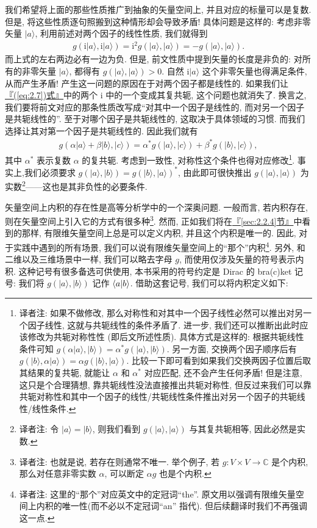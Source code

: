 \documentclass[lang=cn,zihao=-4,twoside,fontset=none]{textbook}
\newcommand{\gt}{>}
\def\EQ#1{\begin{equation}\begin{aligned}{}#1\end{aligned}\end{equation}}
\def\eq#1{\[\begin{aligned}{}#1\end{aligned}\]}
\renewcommand{\eqref}[1]{\hyperref[#1]{『\textnormal{(\ref*{#1})}式』}}
\newcommand{\secref}[1]{\hyperref[#1]{『\textnormal{\ref*{#1}}节』}}
\newcommand{\ii}{{\mathrm{i}}}
\renewcommand{\ket}[1]{| #1 \rangle}
\begin{document}
我们希望将上面的那些性质推广到抽象的矢量空间上, 并且对应的标量可以是复数. 但是, 将这些性质逐句照搬到这种情形却会导致矛盾! 具体问题是这样的: 考虑非零矢量 $\ket{a}$, 利用前述对两个因子的线性性质, 我们就得到 
\EQ{
    g(\ii\ket{a},\ii\ket{a})=\ii^2 g(\ket{a},\ket{a})=-g(\ket{a},\ket{a}). \label{eq:2.7}
}
而上式的左右两边必有一边为负. 但是, 前文性质中提到矢量的长度是非负的: 对所有的非零矢量 $\ket{a}$, 都得有 $g(\ket{a},\ket{a})\gt 0$. 自然 $\ii\ket{a}$ 这个非零矢量也得满足条件, 从而产生矛盾! 产生这一问题的原因在于对两个因子都是线性的. 如果我们让\eqref{eq:2.7}中的两个 $\ii$ 中的一个变成其复共轭, 这个问题也就消失了. 换言之, 我们要将前文对应的那条性质改写成``对其中一个因子是线性的, 而对另一个因子是共轭线性的''. 至于对哪个因子是共轭线性的, 这取决于具体领域的习惯. 而我们选择让其对第一个因子是共轭线性的. 因此我们就有 
\eq{
    g(\alpha\ket{a}+\beta\ket{b},\ket{c})=\alpha^* g(\ket{a},\ket{c}) + \beta^* g(\ket{b},\ket{c}),
}
其中 $\alpha^*$ 表示复数 $\alpha$ 的复共轭. 考虑到一致性, 对称性这个条件也得对应修改\footnote{译者注: 如果不做修改, 那么对称性和对其中一个因子线性必然可以推出对另一个因子线性, 这就与共轭线性的条件矛盾了. 进一步, 我们还可以推断出此时应该修改为共轭对称性性 (即后文所述性质). 具体方式是这样的: 根据共轭线性条件可知 $g(\alpha\ket{a},\ket{b})=\alpha^* g(\ket{a},\ket{b})$. 另一方面, 交换两个因子顺序后有 $g(\ket{b},\alpha\ket{a})=\alpha g(\ket{b},\ket{a})$. 比较一下即可看到如果我们交换两因子位置后取其结果的复共轭, 就能让 $\alpha$ 和 $\alpha^*$ 对应匹配, 还不会产生任何矛盾! 但是注意, 这只是个合理猜想, 靠共轭线性没法直接推出共轭对称性, 但反过来我们可以靠共轭对称性和其中一个因子的线性/共轭线性条件推出对另一个因子的共轭线性/线性条件.}. 事实上,我们必须要求 $g(\ket{a},\ket{b})=g(\ket{b},\ket{a})^*$, 由此即可很快推出 $g(\ket{a},\ket{a})$ 为实数\footnote{译者注: 令 $\ket{a}=\ket{b}$, 则我们看到 $g(\ket{a},\ket{a})$ 与其复共轭相等, 因此必然是实数.}——这也是其非负性的必要条件. 

矢量空间上内积的存在性是高等分析学中的一个深奥问题. 一般而言, 若内积存在, 则在矢量空间上引入它的方式有很多种\footnote{译者注: 也就是说, 若存在则通常不唯一. 举个例子, 若 $g:V\times V\to\mathbb C$ 是个内积, 那么对任意非零实数 $\alpha$, 可以断定 $\alpha g$ 也是个内积.}. 然而, 正如我们将在\secref{sec:2.2.4}中看到的那样, 有限维矢量空间上总是可以定义内积, 并且这个内积是唯一的.  因此, 对于实践中遇到的所有场景, 我们可以说有限维矢量空间上的``那个''内积\footnote{译者注: 这里的``那个''对应英文中的定冠词``the''. 原文用以强调有限维矢量空间上内积的唯一性(而不必以不定冠词``an'' 指代). 但后续翻译时我们不再强调这一点.}. 另外, 和二维以及三维场景中一样, 我们可以略去字母 $g$, 而使用仅涉及矢量的符号表示内积. 这种记号有很多备选可供使用, 本书采用的符号约定是 Dirac 的 bra(c)ket 记号: 我们将 $g(\ket{a},\ket{b})$ 记作 $\expval{a|b}$. 借助这套记号, 我们可以将内积定义如下:
\end{document}
